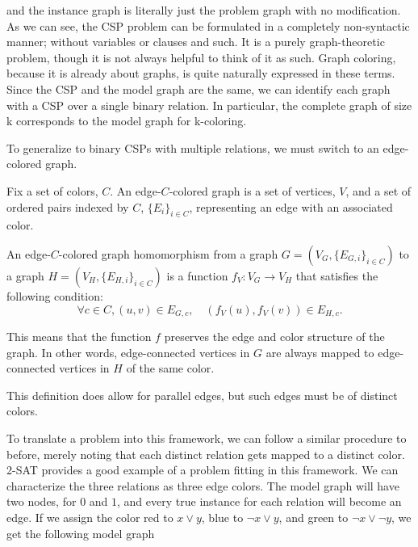 \begin{center}
\end{center}


and the instance graph is literally just the problem graph with no modification. As we can see, the CSP problem can be formulated in a completely non-syntactic manner; without variables or clauses and such. It is a purely graph-theoretic problem, though it is not always helpful to think of it as such. Graph coloring, because it is already about graphs, is quite naturally expressed in these terms. Since the CSP and the model graph are the same, we can identify each graph with a CSP over a single binary relation. In particular, the complete graph of size k corresponds to the model graph for k-coloring.

To generalize to binary CSPs with multiple relations, we must switch to an edge-colored graph. 

\begin{definition}
Fix a set of colors, $C$. An edge-$C$-colored graph is a set of vertices, $V$, and a set of ordered pairs indexed by $C$, $\{E_i\}_{i\in C}$, representing an edge with an associated color. 
\end{definition}

\begin{definition}
An edge-$C$-colored graph homomorphism from a graph $G = (V_G, \{E_{G,i}\}_{i\in C})$ to a graph $H = (V_H, \{E_{H, i}\}_{i\in C})$ is a function $f_V: V_G \rightarrow V_H$ that satisfies the following condition:
\begin{equation}
    \forall c \in C, (u, v) \in E_{G, c}, \quad (f_V(u), f_V(v)) \in E_{H, c}.    
\end{equation}    
\end{definition}

This means that the function $f$ preserves the edge and color structure of the graph. In other words, edge-connected vertices in $G$ are always mapped to edge-connected vertices in $H$ of the same color.

This definition does allow for parallel edges, but such edges must be of distinct colors.

To translate a problem into this framework, we can follow a similar procedure to before, merely noting that each distinct relation gets mapped to a distinct color. 2-SAT provides a good example of a problem fitting in this framework. We can characterize the three relations as three edge colors. The model graph will have two nodes, for $0$ and $1$, and every true instance for each relation will become an edge. If we assign the color red to $x \vee y$, blue to $\neg x \vee y$, and green to $\neg x \vee \neg y$, we get the following model graph

